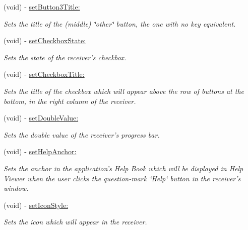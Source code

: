 \begin{CompactItemize}
(void) - \hyperlink{interface_s_s_y_alert_fad35969716cbdfd1dd97e17b1f53b3a}{setButton3Title:}
\begin{CompactList}\small\item\em Sets the title of the (middle) \char`\"{}other\char`\"{} button, the one with no key equivalent. \item\end{CompactList}\item 
(void) - \hyperlink{interface_s_s_y_alert_c2c9673b89f04e422a6605887ccea330}{setCheckboxState:}
\begin{CompactList}\small\item\em Sets the state of the receiver's checkbox. \item\end{CompactList}\item 
(void) - \hyperlink{interface_s_s_y_alert_4dc3de44c2334f8d871bd01eeffe75b6}{setCheckboxTitle:}
\begin{CompactList}\small\item\em Sets the title of the checkbox which will appear above the row of buttons at the bottom, in the right column of the receiver. \item\end{CompactList}\item 
(void) - \hyperlink{interface_s_s_y_alert_afae30a5f44eb75295549e0330cce30b}{setDoubleValue:}
\begin{CompactList}\small\item\em Sets the double value of the receiver's progress bar. \item\end{CompactList}\item 
(void) - \hyperlink{interface_s_s_y_alert_13b93cc5e7a16913f29ce3da427509d1}{setHelpAnchor:}
\begin{CompactList}\small\item\em Sets the anchor in the application's Help Book which will be displayed in Help Viewer when the user clicks the question-mark \char`\"{}Help\char`\"{} button in the receiver's window. \item\end{CompactList}\item 
(void) - \hyperlink{interface_s_s_y_alert_ecb6c9cfdff8c675ad91af57ffbc0fdf}{setIconStyle:}
\begin{CompactList}\small\item\em Sets the icon which will appear in the receiver. \item\end{CompactList}\item 

\end{CompactItemize}

